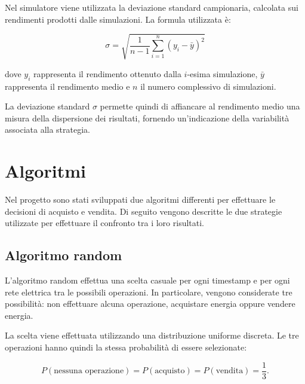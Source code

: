 \documentclass[a4paper,oneside,italian]{sapthesis}
\begin{document}
Nel simulatore viene utilizzata la deviazione standard campionaria, calcolata
sui rendimenti prodotti dalle simulazioni. La formula utilizzata è:

\begin{equation}
\sigma =
\sqrt{
\frac{1}{n-1}
\sum_{i=1}^{n}
\left(y_i-\bar{y}\right)^2
}
\end{equation}

dove $y_i$ rappresenta il rendimento ottenuto dalla $i$-esima simulazione,
$\bar{y}$ rappresenta il rendimento medio e $n$ il numero complessivo di
simulazioni.

La deviazione standard $\sigma$ permette quindi di affiancare al rendimento
medio una misura della dispersione dei risultati, fornendo un'indicazione
della variabilità associata alla strategia.



\section{Algoritmi}

Nel progetto sono stati sviluppati due algoritmi differenti per effettuare
le decisioni di acquisto e vendita. Di seguito vengono descritte le due
strategie utilizzate per effettuare il confronto tra i loro risultati.



\subsection{Algoritmo random}

L'algoritmo random effettua una scelta casuale per ogni timestamp e per ogni
rete elettrica tra le possibili operazioni. In particolare, vengono
considerate tre possibilità: non effettuare alcuna operazione, acquistare
energia oppure vendere energia.

La scelta viene effettuata utilizzando una distribuzione uniforme discreta.
Le tre operazioni hanno quindi la stessa probabilità di essere selezionate:

\begin{equation}
P(\text{nessuna operazione}) =
P(\text{acquisto}) =
P(\text{vendita}) =
\frac{1}{3}.
\end{equation}
\end{document}
